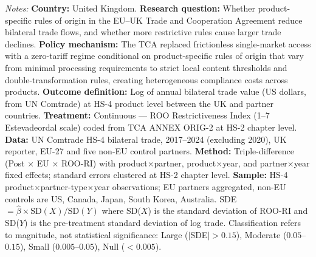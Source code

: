 \begin{table}[H]
\begin{threeparttable}
\begin{tablenotes}[flushleft]
\item \textit{Notes:} \textbf{Country:} United Kingdom. \textbf{Research question:} Whether product-specific rules of origin in the EU--UK Trade and Cooperation Agreement reduce bilateral trade flows, and whether more restrictive rules cause larger trade declines. \textbf{Policy mechanism:} The TCA replaced frictionless single-market access with a zero-tariff regime conditional on product-specific rules of origin that vary from minimal processing requirements to strict local content thresholds and double-transformation rules, creating heterogeneous compliance costs across products. \textbf{Outcome definition:} Log of annual bilateral trade value (US dollars, from UN Comtrade) at HS-4 product level between the UK and partner countries. \textbf{Treatment:} Continuous --- ROO Restrictiveness Index (1--7 Estevadeordal scale) coded from TCA ANNEX ORIG-2 at HS-2 chapter level. \textbf{Data:} UN Comtrade HS-4 bilateral trade, 2017--2024 (excluding 2020), UK reporter, EU-27 and five non-EU control partners. \textbf{Method:} Triple-difference (Post $\times$ EU $\times$ ROO-RI) with product$\times$partner, product$\times$year, and partner$\times$year fixed effects; standard errors clustered at HS-2 chapter level. \textbf{Sample:} HS-4 product$\times$partner-type$\times$year observations; EU partners aggregated, non-EU controls are US, Canada, Japan, South Korea, Australia. SDE $= \hat{\beta} \times \text{SD}(X) / \text{SD}(Y)$ where SD($X$) is the standard deviation of ROO-RI and SD($Y$) is the pre-treatment standard deviation of log trade. Classification refers to magnitude, not statistical significance: Large ($|$SDE$| > 0.15$), Moderate ($0.05$--$0.15$), Small ($0.005$--$0.05$), Null ($< 0.005$).
\end{tablenotes}
\end{threeparttable}
\end{table}
